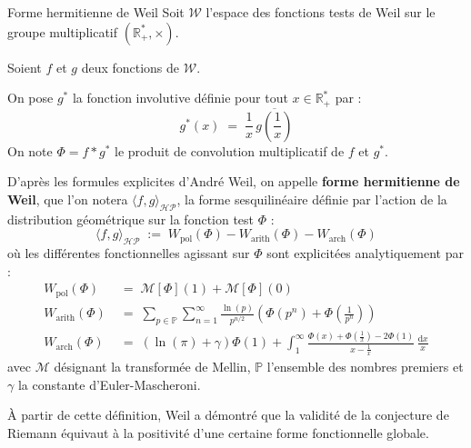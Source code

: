\documentclass[Riemann_Hypothesis.tex]{subfiles}
\begin{document}
\begin{DefNef}[label=df:FormeHermitienneWeil_fr_intro]{Forme hermitienne de Weil}
    Soit $\mathcal{W}$ l'espace des fonctions tests de Weil sur le groupe 
    multiplicatif $\left(\mathbb{R}_+^*, \times\right)$. \par
    Soient $f$ et $g$ deux fonctions de $\mathcal{W}$. \par
    On pose $g^*$ la fonction involutive définie pour tout $x \in \mathbb{R}_+^*$ par :
    \begin{equation*}
        g^*(x) \;=\; \frac{1}{x} \, \overline{g\left(\frac{1}{x}\right)}
    \end{equation*}
    On note $\Phi = f * g^*$ le produit de convolution multiplicatif de $f$ et $g^*$. \par
    D'après les formules explicites d'André Weil, on appelle 
    \textbf{forme hermitienne de Weil}, que l'on notera $\langle f, g \rangle_{\mathcal{HP}}$, la forme sesquilinéaire définie par l'action de la distribution géométrique sur la fonction test $\Phi$ :
    \begin{equation*}
        \langle f, g \rangle_{\mathcal{HP}} \;:=\; W_{\text{pol}}(\Phi) - W_{\text{arith}}(\Phi) - W_{\text{arch}}(\Phi)
    \end{equation*}
    où les différentes fonctionnelles agissant sur $\Phi$ sont explicitées analytiquement par :
    \begin{align*}
        W_{\text{pol}}(\Phi) \;&=\; \mathcal{M}[\Phi](1) + \mathcal{M}[\Phi](0) \\
        W_{\text{arith}}(\Phi) \;&=\; \sum_{p \in \mathbb{P}} \sum_{n=1}^{\infty} \frac{\ln(p)}{p^{n/2}} \left( \Phi(p^n) + \Phi\left(\frac{1}{p^n}\right) \right) \\
        W_{\text{arch}}(\Phi) \;&=\; \left( \ln(\pi) + \gamma \right) \Phi(1) + \int_{1}^{\infty} \frac{\Phi(x) + \Phi\left(\frac{1}{x}\right) - 2\Phi(1)}{x - \frac{1}{x}} \, \frac{\mathrm{d}x}{x}
    \end{align*}
    avec $\mathcal{M}$ désignant la transformée de Mellin, $\mathbb{P}$ l'ensemble des nombres premiers et $\gamma$ la constante d'Euler-Mascheroni.
\end{DefNef}

À partir de cette définition, Weil a démontré que la validité de la conjecture de Riemann 
équivaut à la positivité d'une certaine forme fonctionnelle globale.
\end{document}
